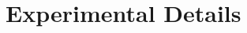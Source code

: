 \section{\name}\label{app:sec:appexpproof}


\newpage
\section{Experimental Details}\label{app:sec:expdetails}
